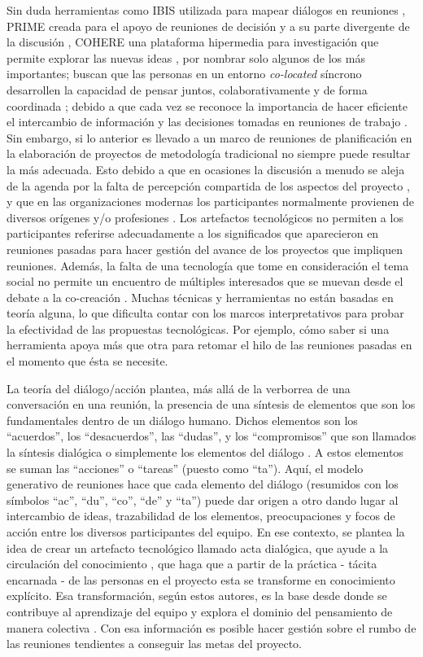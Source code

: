 Sin duda herramientas como IBIS utilizada para mapear diálogos en reuniones , PRIME creada para el apoyo de reuniones de decisión y a su parte divergente de la discusión , COHERE una plataforma hipermedia para investigación que permite explorar las nuevas ideas , por nombrar solo algunos de los más importantes; buscan que las personas en un entorno \textit{co-located} síncrono desarrollen la capacidad de pensar juntos, colaborativamente y de forma coordinada ; debido a que cada vez se reconoce la importancia de hacer eficiente el intercambio de información y las decisiones tomadas en reuniones de trabajo . Sin embargo, si lo anterior es llevado a un marco de reuniones de planificación en la elaboración de proyectos de metodología tradicional no siempre puede resultar la más adecuada. Esto debido a que en ocasiones la discusión a menudo se aleja de la agenda por la falta de percepción compartida de los aspectos del proyecto , y que en las organizaciones modernas los participantes normalmente provienen de diversos orígenes y/o profesiones . Los artefactos tecnológicos no permiten a los participantes referirse adecuadamente a los significados que aparecieron en reuniones pasadas  para hacer gestión del avance de los proyectos que impliquen reuniones. Además, la falta de una tecnología que tome en consideración el tema social no permite un encuentro de múltiples interesados que se muevan desde el debate a la co-creación . Muchas técnicas y herramientas no están basadas en teoría alguna, lo que dificulta contar con los marcos interpretativos para probar la efectividad de las propuestas tecnológicas. Por ejemplo, cómo saber si una herramienta apoya más que otra para retomar el hilo de las reuniones pasadas en el momento que ésta se necesite.


La teoría del diálogo/acción plantea, más allá de la verborrea de una conversación en una reunión, la presencia de una síntesis de elementos que son los fundamentales dentro de un diálogo humano. Dichos elementos son los “acuerdos”, los “desacuerdos”, las “dudas”, y los “compromisos” que son llamados la síntesis dialógica o simplemente los elementos del diálogo . A estos elementos se suman las “acciones” o “tareas” (puesto como “ta”). Aquí, el modelo generativo de reuniones hace que cada elemento del diálogo (resumidos con los símbolos “ac”, “du”, “co”, “de” y “ta”) puede dar origen a otro dando lugar al intercambio de ideas, trazabilidad de los elementos, preocupaciones y focos de acción entre los diversos participantes del equipo. En ese contexto, se plantea la idea de crear un artefacto tecnológico llamado acta dialógica, que ayude a la circulación del conocimiento , que haga que a partir de la práctica - tácita encarnada - de las personas en el proyecto esta se transforme en conocimiento explícito. Esa transformación, según estos autores, es la base desde donde se contribuye al aprendizaje del equipo y explora el dominio del pensamiento de manera colectiva . Con esa información es posible hacer gestión sobre el rumbo de las reuniones tendientes a conseguir las metas del proyecto.

